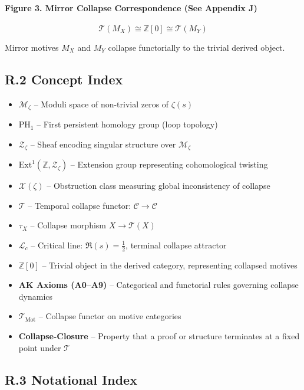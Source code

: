 \documentclass[11pt]{article}
\newcommand{\Sha}{\mathcal{X}}
\begin{document}
\paragraph{Figure 3. Mirror Collapse Correspondence (See Appendix J)}
\[
\mathcal{T}(M_X) \cong \mathbb{Z}[0] \cong \mathcal{T}(M_Y)
\]

Mirror motives $M_X$ and $M_Y$ collapse functorially to the trivial derived object.

\subsection*{R.2 Concept Index}

\begin{itemize}
    \item \textbf{$\mathcal{M}_\zeta$} – Moduli space of non-trivial zeros of $\zeta(s)$
    \item \textbf{$\mathrm{PH}_1$} – First persistent homology group (loop topology)
    \item \textbf{$\mathcal{Z}_\zeta$} – Sheaf encoding singular structure over $\mathcal{M}_\zeta$
    \item \textbf{$\mathrm{Ext}^1(\mathbb{Z}, \mathcal{Z}_\zeta)$} – Extension group representing cohomological twisting
    \item \textbf{$\Sha(\zeta)$} – Obstruction class measuring global inconsistency of collapse
    \item \textbf{$\mathcal{T}$} – Temporal collapse functor: $\mathcal{C} \to \mathcal{C}$
    \item \textbf{$\tau_X$} – Collapse morphism $X \to \mathcal{T}(X)$
    \item \textbf{$\mathcal{L}_c$} – Critical line: $\Re(s) = \tfrac{1}{2}$, terminal collapse attractor
    \item \textbf{$\mathbb{Z}[0]$} – Trivial object in the derived category, representing collapsed motives
    \item \textbf{AK Axioms (A0–A9)} – Categorical and functorial rules governing collapse dynamics
    \item \textbf{$\mathcal{T}_{\mathrm{Mot}}$} – Collapse functor on motive categories
    \item \textbf{Collapse-Closure} – Property that a proof or structure terminates at a fixed point under $\mathcal{T}$
\end{itemize}

\subsection*{R.3 Notational Index}
\end{document}
